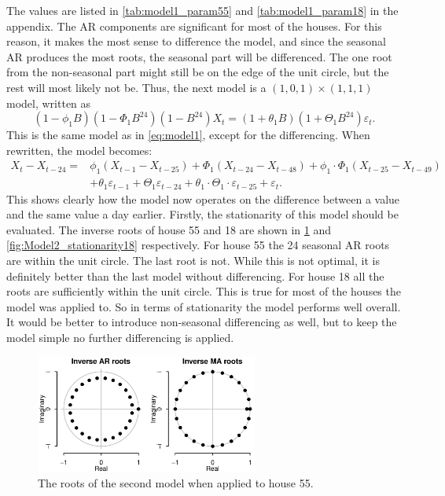 The values are listed in \cref{tab:model1_param55} and \cref{tab:model1_param18} in the appendix. The AR components are significant for most of the houses. For this reason, it makes the most sense to difference the model, and since the seasonal AR produces the most roots, the seasonal part will be differenced. The one root from the non-seasonal part might still be on the edge of the unit circle, but the rest will most likely not be.
Thus, the next model is a $(1,0,1)\times(1,1,1)$ model, written as
\begin{equation}
    (1-\phi_1 B)(1-\Phi_1 B^{24})(1-B^{24})X_t = (1+\theta_1 B)(1+\Theta_1 B^{24}) \varepsilon_t.
\end{equation}
This is the same model as in \cref{eq:model1}, except for the differencing. When rewritten, the model becomes:
\begin{align}
    X_t-X_{t-24} = &\phi_1 (X_{t-1}-X_{t-25}) + \Phi_1 (X_{t-24}-X_{t-48}) + \phi_1 \cdot \Phi_1  (X_{t-25}-X_{t-49})\nonumber  \\  &+ \theta_1 \varepsilon_{t-1} + \Theta_1 \varepsilon_{t-24} + \theta_1 \cdot \Theta_1 \cdot \varepsilon_{t-25} + \varepsilon_t. \label{model101111}
\end{align}
This shows clearly how the model now operates on the difference between a value and the same value a day earlier. Firstly, the stationarity of this model should be evaluated. The inverse roots of house 55 and 18 are shown in \cref{fig:Model2_stationarity55} and \cref{fig:Model2_stationarity18} respectively. For house 55 the 24 seasonal AR roots are within the unit circle. The last root is not. While this is not optimal, it is definitely better than the last model without differencing. For house 18 all the roots are sufficiently within the unit circle. This is true for most of the houses the model was applied to. So in terms of stationarity the model performs well overall. It would be better to introduce non-seasonal differencing as well, but to keep the model simple no further differencing is applied.
\begin{figure}[ht]
    \centering
    \includegraphics[width=0.65\textwidth]{../../../figures/arimax/Roots_55.eps}
    \caption{The roots of the second model when applied to house 55.}
    \label{fig:Model2_stationarity55}
\end{figure}
